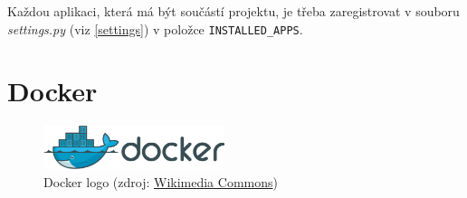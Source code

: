 Každou aplikaci, která má být součástí projektu, je třeba zaregistrovat v souboru \textit{settings.py} (viz \ref{settings}) v položce \texttt{INSTALLED\_APPS}.

\newpage
\section{Docker}

\begin{figure}[H] \centering
      \includegraphics[width=150pt]{./pictures/Docker_(container_engine)_logo.png}
      \caption[Docker logo]{Docker logo (zdroj:
\href{https://commons.wikimedia.org/wiki/File:Docker_(container_engine)_logo.png}{Wikimedia Commons})}
      \label{fig:docker}
  \end{figure}

